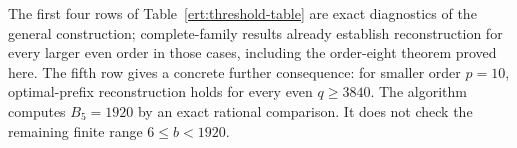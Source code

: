 The first four rows of Table~\ref{ert:threshold-table} are exact
diagnostics of the general construction; complete-family results
already establish reconstruction for every larger even order in those
cases, including the order-eight theorem proved here. The fifth row
gives a concrete further consequence: for smaller order $p=10$,
optimal-prefix reconstruction holds for every even $q\ge3840$.
The algorithm computes $B_5=1920$ by an exact rational comparison.
It does not check the remaining finite range $6\le b<1920$.

